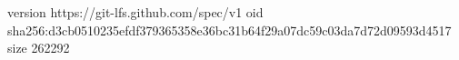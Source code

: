 version https://git-lfs.github.com/spec/v1
oid sha256:d3cb0510235efdf379365358e36bc31b64f29a07dc59c03da7d72d09593d4517
size 262292

